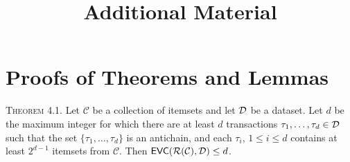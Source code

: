 \documentclass[twoside,leqno,twocolumn]{article}
\def\Ds{{\cal D}}
\def\EVC{\mathsf{EVC}}
\def\range{\mathcal{R}}
\begin{document}
\title{Additional Material}
\section{Proofs of Theorems and Lemmas}

\textsc{Theorem 4.1.} Let $\mathcal{C}$ be a collection of itemsets and let $\Ds$ be a dataset. Let
  $d$ be the maximum integer for which there are at least $d$
  transactions $\tau_1,\dotsc,\tau_d\in \Ds$ such that the set
  $\{\tau_1,\dotsc,\tau_d\}$ is an antichain, and each $\tau_i$, $1\le i\le d$
  contains at least $2^{d-1}$ itemsets from $\mathcal{C}$. 
  Then $\EVC(\range(\mathcal{C}),\Ds)\le d$.
\end{document}
